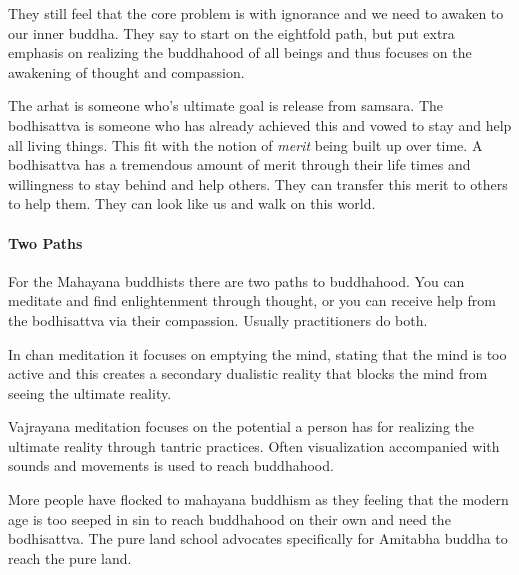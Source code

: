 \documentclass{article}
\begin{document}
They still feel that the core problem is with ignorance and we need to awaken to our inner buddha. They say to start on the eightfold path, but put extra emphasis on realizing the buddhahood of all beings and thus focuses on the awakening of thought and compassion.

The arhat is someone who's ultimate goal is release from samsara. The bodhisattva is someone who has already achieved this and vowed to stay and help all living things. This fit with the notion of \emph{merit} being built up over time. A bodhisattva has a tremendous amount of merit through their life times and willingness to stay behind and help others. They can transfer this merit to others to help them. They can look like us and walk on this world.

\paragraph{Two Paths}
\label{par:two_paths}
For the Mahayana buddhists there are two paths to buddhahood. You can meditate and find enlightenment through thought, or you can receive help from the bodhisattva via their compassion. Usually practitioners do both.

In chan meditation it focuses on emptying the mind, stating that the mind is too active and this creates a secondary dualistic reality that blocks the mind from seeing the ultimate reality.

Vajrayana meditation focuses on the potential a person has for realizing the ultimate reality through tantric practices. Often visualization accompanied with sounds and movements is used to reach buddhahood.

More people have flocked to mahayana buddhism as they feeling that the modern age is too seeped in sin to reach buddhahood on their own and need the bodhisattva. The pure land school advocates specifically for Amitabha buddha to reach the pure land.
\end{document}
